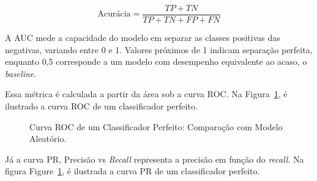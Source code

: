 \begin{equation}
\text{Acurácia} = \frac{TP + TN}{TP + TN + FP + FN}
\end{equation}

A AUC mede a capacidade do modelo em separar as classes positivas das negativas, variando entre 0 e 1. Valores próximos de 1 indicam separação perfeita, enquanto 0,5 corresponde a um modelo com desempenho equivalente ao acaso,
o \textit{baseline}.

Essa métrica é calculada a partir da área sob a curva ROC. Na Figura~\ref{fig:roc_perfect}, é ilustrado a curva ROC de um classificador perfeito.

\begin{figure}[H]
    \centering
    \caption{Curva ROC de um Classificador Perfeito: Comparação com Modelo Aleatório.}
    \label{fig:roc_perfect}
\end{figure}

Já a curva PR, Precisão vs \textit{Recall} representa a precisão em função do \textit{recall}. Na figura Figure~\ref{fig:roc_perfect},
é ilustrada a curva PR de um classificador perfeito.

\pgfplotsset{compat=1.18}


